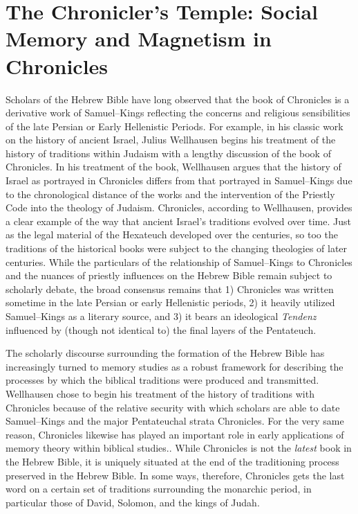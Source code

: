 \hypertarget{the-chroniclers-temple-social-memory-and-magnetism-in-chronicles}{%
\chapter{The Chronicler's Temple: Social Memory and Magnetism in
Chronicles}\label{the-chroniclers-temple-social-memory-and-magnetism-in-chronicles}}

Scholars of the Hebrew Bible have long observed that the book of
Chronicles is a derivative work of Samuel--Kings reflecting the concerns
and religious sensibilities of the late Persian or Early Hellenistic
Periods. For example, in his classic work on the history of ancient
Israel, Julius Wellhausen begins his treatment of the history of
traditions within Judaism with a lengthy discussion of the book of
Chronicles. In his treatment of the book, Wellhausen argues that the
history of Israel as portrayed in Chronicles differs from that portrayed
in Samuel--Kings due to the chronological distance of the works and the
intervention of the Priestly Code into the theology of
\secondtemple Judaism.\autocites[171--172]{wellhausen1957}[See
also][]{wright_ulrich-wright1992} Chronicles, according to Wellhausen,
provides a clear example of the way that ancient Israel's traditions
evolved over time. Just as the legal material of the Hexateuch developed
over the centuries, so too the traditions of the historical books were
subject to the changing theologies of later centuries. While the
particulars of the relationship of Samuel--Kings to Chronicles and the
nuances of priestly influences on the Hebrew Bible remain subject to
scholarly debate, the broad consensus remains that 1) Chronicles was
written sometime in the late Persian or early Hellenistic periods, 2) it
heavily utilized Samuel--Kings as a literary source, and 3) it bears an
ideological \emph{Tendenz} influenced by (though not identical to) the
final layers of the Pentateuch.\autocites[For a thorough and reasonably
recent summary of the \emph{status questionis},
see][72--89]{knoppers2003}[See
also][]{japhet1993}{japhet2009}{braun1986}[and][]{coggins1976}

The scholarly discourse surrounding the formation of the Hebrew Bible
has increasingly turned to memory studies as a robust framework for
describing the processes by which the biblical traditions were produced
and
transmitted.\autocites{wright2014}{blenkinsopp2013}{rogerson2010}{davies2008}{hendel2005}{smith_cbq2002}
Wellhausen chose to begin his treatment of the history of traditions
with Chronicles because of the relative security with which scholars are
able to date Samuel--Kings and the major Pentateuchal strata
\visavis Chronicles. For the very same reason,
Chronicles likewise has played an important role in early applications
of memory theory within biblical
studies.\autocites{benzvi_st2017}{benzvi-a_evans-williams2013}{benzvi-b_evans-williams2013}.
While Chronicles is not the \emph{latest} book in the Hebrew Bible, it
is uniquely situated at the end of the traditioning process preserved in
the Hebrew Bible. In some ways, therefore, Chronicles gets the last word
on a certain set of traditions surrounding the monarchic period, in
particular those of David, Solomon, and the kings of Judah.

